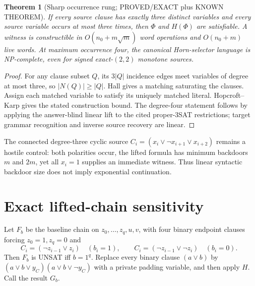 \documentclass[11pt]{article}
\newtheorem{theorem}{Theorem}
\begin{document}
\begin{theorem}[Sharp occurrence rung; PROVED/EXACT plus KNOWN THEOREM]
If every source clause has exactly three distinct variables and every source variable occurs at most three times, then $\Phi$ and $H(\Phi)$ are satisfiable.  A witness is constructible in $O(n_0+m\sqrt m)$ word operations and $O(n_0+m)$ live words.  At maximum occurrence four, the canonical Horn-selector language is NP-complete, even for signed exact-$(2,2)$ monotone sources.
\end{theorem}
\begin{proof}
For any clause subset $Q$, its $3|Q|$ incidence edges meet variables of degree at most three, so $|N(Q)|\ge|Q|$.  Hall gives a matching saturating the clauses.  Assign each matched variable to satisfy its uniquely matched literal.  Hopcroft--Karp gives the stated construction bound.  The degree-four statement follows by applying the answer-blind linear lift to the cited proper-3SAT restrictions; target grammar recognition and inverse source recovery are linear.
\end{proof}

The connected degree-three cyclic source $C_i=(x_i\vee\neg x_{i+1}\vee x_{i+2})$ remains a hostile control: both polarities occur, the lifted formula has minimum backdoors $m$ and $2m$, yet all $x_i=1$ supplies an immediate witness.  Thus linear syntactic backdoor size does not imply exponential continuation.

\section{Exact lifted-chain sensitivity}
Let $F_b$ be the baseline chain on $z_0,\ldots,z_q,u,v$, with four binary endpoint clauses forcing $z_0=1,z_q=0$ and
\[
C_i=(\neg z_{i-1}\vee z_i)\quad(b_i=1),\qquad
C_i=(\neg z_{i-1}\vee\neg z_i)\quad(b_i=0).
\]
Then $F_b$ is UNSAT iff $b=1^q$.  Replace every binary clause $(a\vee b)$ by
$(a\vee b\vee y_C)(a\vee b\vee\neg y_C)$ with a private padding variable, and then apply $H$.  Call the result $G_b$.
\end{document}
